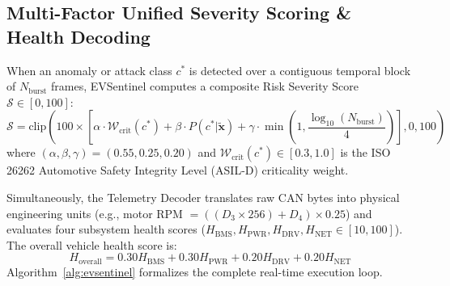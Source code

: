 \documentclass[conference]{IEEEtran}
\begin{document}
\subsection{Multi-Factor Unified Severity Scoring \& Health Decoding}
When an anomaly or attack class $c^*$ is detected over a contiguous temporal block of $N_{\text{burst}}$ frames, EVSentinel computes a composite Risk Severity Score $\mathcal{S} \in [0, 100]$:
\begin{equation}
    \mathcal{S} = \text{clip}\left( 100 \times \left[ \alpha \cdot \mathcal{W}_{\text{crit}}(c^*) + \beta \cdot P(c^*|\tilde{\mathbf{x}}) + \gamma \cdot \min\left(1, \frac{\log_{10}(N_{\text{burst}})}{4}\right) \right], 0, 100 \right)
\end{equation}
where $(\alpha, \beta, \gamma) = (0.55, 0.25, 0.20)$ and $\mathcal{W}_{\text{crit}}(c^*) \in [0.3, 1.0]$ is the ISO 26262 Automotive Safety Integrity Level (ASIL-D) criticality weight.

Simultaneously, the Telemetry Decoder translates raw CAN bytes into physical engineering units (e.g., motor RPM $= ((D_3 \times 256) + D_4) \times 0.25$) and evaluates four subsystem health scores ($H_{\text{BMS}}, H_{\text{PWR}}, H_{\text{DRV}}, H_{\text{NET}} \in [10, 100]$). The overall vehicle health score is:
\begin{equation}
    H_{\text{overall}} = 0.30 H_{\text{BMS}} + 0.30 H_{\text{PWR}} + 0.20 H_{\text{DRV}} + 0.20 H_{\text{NET}}
\end{equation}
Algorithm~\ref{alg:evsentinel} formalizes the complete real-time execution loop.
\end{document}
